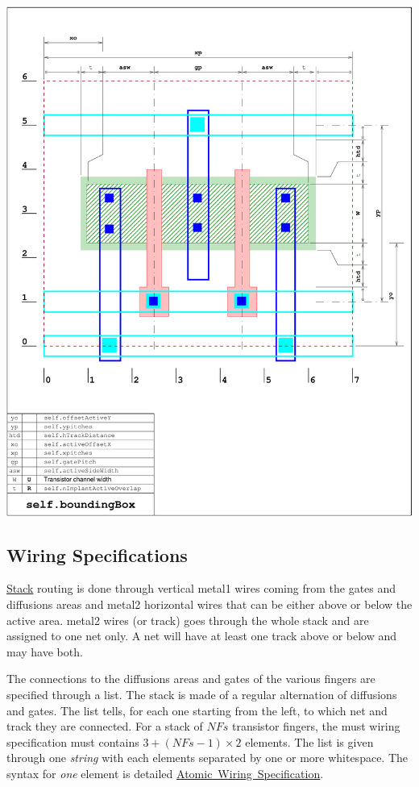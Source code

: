  
\begin{DoxyImage}
\includegraphics[width=.9\linewidth]{stack-layout-3}
\end{DoxyImage}
\hypertarget{classpython_1_1stack_1_1Stack_secWiringSpecs}{}\subsection{Wiring Specifications}\label{classpython_1_1stack_1_1Stack_secWiringSpecs}
\mbox{\hyperlink{classpython_1_1stack_1_1Stack}{Stack}} routing is done through vertical {\ttfamily metal1} wires coming from the gates and diffusions areas and {\ttfamily metal2} horizontal wires that can be either above or below the active area. {\ttfamily metal2} wires (or track) goes through the whole stack and are assigned to one net only. A net will have at least one track above or below and may have both.

The connections to the diffusions areas and gates of the various fingers are specified through a list. The stack is made of a regular alternation of diffusions and gates. The list tells, for each one starting from the left, to which net and track they are connected. For a stack of $NFs$ transistor fingers, the must wiring specification must contains $ 3 + (NFs-1) \times 2$ elements. The list is given through one {\itshape string} with each elements separated by one or more whitespace. The syntax for {\itshape one} element is detailed \mbox{\hyperlink{classpython_1_1stack_1_1Stack_secAtomicWiring}{Atomic Wiring Specification}}.


